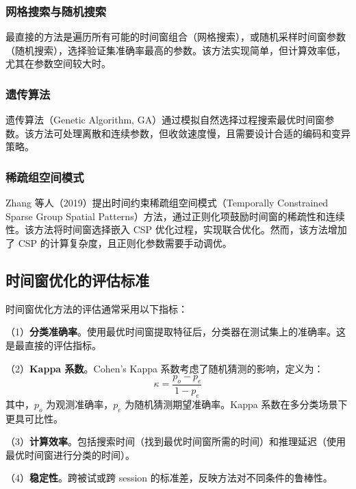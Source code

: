 \subsubsection{网格搜索与随机搜索}

最直接的方法是遍历所有可能的时间窗组合（网格搜索），或随机采样时间窗参数（随机搜索），选择验证集准确率最高的参数。该方法实现简单，但计算效率低，尤其在参数空间较大时。

\subsubsection{遗传算法}

遗传算法（Genetic Algorithm, GA）通过模拟自然选择过程搜索最优时间窗参数。该方法可处理离散和连续参数，但收敛速度慢，且需要设计合适的编码和变异策略。

\subsubsection{稀疏组空间模式}

Zhang 等人（2019）提出时间约束稀疏组空间模式（Temporally Constrained Sparse Group Spatial Patterns）方法，通过正则化项鼓励时间窗的稀疏性和连续性\cite{zhang2019temporally}。该方法将时间窗选择嵌入 CSP 优化过程，实现联合优化。然而，该方法增加了 CSP 的计算复杂度，且正则化参数需要手动调优。

\subsection{时间窗优化的评估标准}
\label{subsec:evaluation_metrics}

时间窗优化方法的评估通常采用以下指标\cite{tangermann2012review}：

（1）\textbf{分类准确率}。使用最优时间窗提取特征后，分类器在测试集上的准确率。这是最直接的评估指标。

（2）\textbf{Kappa 系数}。Cohen's Kappa 系数考虑了随机猜测的影响，定义为：
\begin{equation}
\kappa = \frac{p_o - p_e}{1 - p_e}
\end{equation}
其中，$p_o$ 为观测准确率，$p_e$ 为随机猜测期望准确率\cite{cohen1960coefficient}。Kappa 系数在多分类场景下更具可比性。

（3）\textbf{计算效率}。包括搜索时间（找到最优时间窗所需的时间）和推理延迟（使用最优时间窗进行分类的时间）\cite{yang2015time}。

（4）\textbf{稳定性}。跨被试或跨 session 的标准差，反映方法对不同条件的鲁棒性\cite{lotte2011regularizing}。

